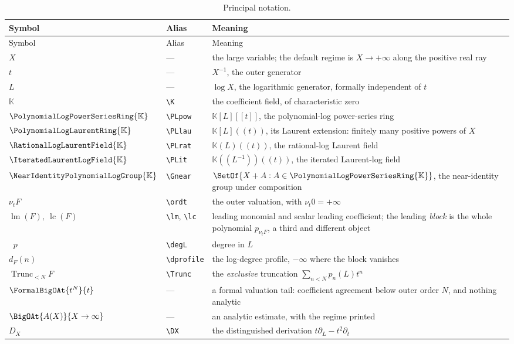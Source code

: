 \documentclass[11pt,oneside]{article}
\theoremstyle{plain}
\theoremstyle{definition}
\theoremstyle{remark}
\newcommand{\K}{\mathbb{K}}
\newcommand{\PLpow}{\PolynomialLogPowerSeriesRing{\K}}   %
\newcommand{\PLlau}{\PolynomialLogLaurentRing{\K}}       %
\newcommand{\PLrat}{\RationalLogLaurentField{\K}}        %
\newcommand{\PLit}{\IteratedLaurentLogField{\K}}         %
\newcommand{\Gnear}{\NearIdentityPolynomialLogGroup{\K}} %
\newcommand{\ordt}{\nu_{t}}                              %
\DeclareMathOperator{\lm}{lm}
\DeclareMathOperator{\lc}{lc}
\DeclareMathOperator{\degL}{deg_{L}}
\newcommand{\Trunc}[2]{\operatorname{Trunc}_{<#2}#1}     %
\newcommand{\DX}{D_{X}}                                  %
\newcommand{\dprofile}[1]{d_{#1}}                        %
\begin{document}
\begin{longtable}{@{}l l p{}@{}}
\caption{Principal notation.}\label{plt:tab:notation}\\
\toprule
Symbol & Alias & Meaning\\
\midrule
\endfirsthead
\toprule
Symbol & Alias & Meaning\\
\midrule
\endhead
\(X\) & --- & the large variable; the default regime is \(X\to+\infty\) along
  the positive real ray\\
\(t\) & --- & \(X^{-1}\), the outer generator\\
\(L\) & --- & \(\log X\), the logarithmic generator, formally independent of
  \(t\)\\
\(\K\) & \verb|\K| & the coefficient field, of characteristic zero\\
\(\PLpow\) & \verb|\PLpow| & \(\K[L][[t]]\), the polynomial-log power-series
  ring\\
\(\PLlau\) & \verb|\PLlau| & \(\K[L]((t))\), its Laurent extension: finitely
  many positive powers of \(X\)\\
\(\PLrat\) & \verb|\PLrat| & \(\K(L)((t))\), the rational-log Laurent field\\
\(\PLit\) & \verb|\PLit| & \(\K((L^{-1}))((t))\), the iterated Laurent-log
  field\\
\(\Gnear\) & \verb|\Gnear| & \(\SetOf{X+A:A\in\PLpow}\), the near-identity
  group under composition\\
\(\ordt F\) & \verb|\ordt| & the outer valuation, with
  \(\ordt 0=+\infty\)\\
\(\lm(F),\ \lc(F)\) & \verb|\lm|, \verb|\lc| & leading monomial and scalar
  leading coefficient; the leading \emph{block} is the whole polynomial
  \(p_{\ordt F}\), a third and different object\\
\(\degL p\) & \verb|\degL| & degree in \(L\)\\
\(\dprofile{F}(n)\) & \verb|\dprofile| & the log-degree profile, \(-\infty\)
  where the block vanishes\\
\(\Trunc{F}{N}\) & \verb|\Trunc| & the \emph{exclusive} truncation
  \(\sum_{n<N}p_n(L)t^n\)\\
\(\FormalBigOAt{t^N}{t}\) & --- & a formal valuation tail: coefficient
  agreement below outer order \(N\), and nothing analytic\\
\(\BigOAt{A(X)}{X\to\infty}\) & --- & an analytic estimate, with the regime
  printed\\
\(\DX\) & \verb|\DX| & the distinguished derivation
  \(t\partial_L-t^{2}\partial_t\)\\

\end{longtable}
\end{document}
